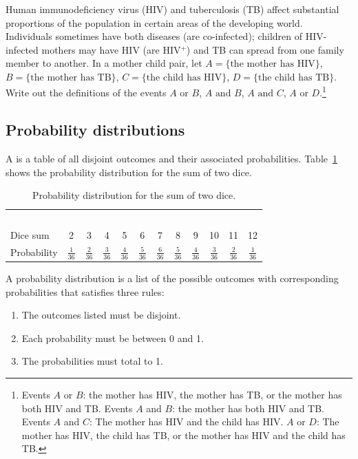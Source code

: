 \begin{exercise}
{Human immunodeficiency virus (HIV) and tuberculosis (TB) affect substantial proportions of the population in certain areas of the developing world. Individuals sometimes have both diseases (are co-infected); children of HIV-infected mothers may have HIV (are HIV$^+$) and TB can spread from one family member to another.  In a mother child pair, let $A = \{\text{the mother has HIV} \}$,  $B = \{\textrm{the mother has TB} \}$, $C = \{\text{the child has HIV} \}$,  $D = \{\text{the child has TB} \}$.  Write out the definitions of the events $A \text{ or } B$, $A \text{ and } B$, $A \text{ and } C$, $A \text{ or } D$.}\footnote{Events $A$ or $B$: the mother has HIV, the mother has TB, or the mother has both HIV and TB. Events $A$ and $B$: the mother has both HIV and TB. Events $A$ and $C$: The mother has HIV and the child has HIV. $A$ or $D$: The mother has HIV, the child has TB, or the mother has HIV and the child has TB.}

\end{exercise}

\subsection{Probability distributions}

A  is a table of all disjoint outcomes and their associated probabilities. Table~\ref{diceProb} shows the probability distribution for the sum of two dice. 

\begin{table}[h] \small
\centering
\begin{tabular}{l ccc ccc ccc cc}
  \hline
  \ \vspace{-3mm} \\
Dice sum\vspace{0.3mm} & 2 & 3 & 4 & 5 & 6 & 7 & 8 & 9 & 10 & 11 & 12  \\
Probability & $\frac{1}{36}$ & $\frac{2}{36}$ & $\frac{3}{36}$ & $\frac{4}{36}$ & $\frac{5}{36}$ & $\frac{6}{36}$ & $\frac{5}{36}$ & $\frac{4}{36}$ & $\frac{3}{36}$ & $\frac{2}{36}$ & $\frac{1}{36}$\vspace{1mm} \\
   \hline
\end{tabular}
\caption{Probability distribution for the sum of two dice.}
\label{diceProb}
\end{table}

\begin{termBox}{
A probability distribution is a list of the possible outcomes with corresponding probabilities that satisfies three rules: \vspace{-2mm}
\begin{enumerate}
\setlength{\itemsep}{0mm}
\item The outcomes listed must be disjoint.
\item Each probability must be between 0 and 1.
\item The probabilities must total to 1. \vspace{1mm}
\end{enumerate}}
\end{termBox}

